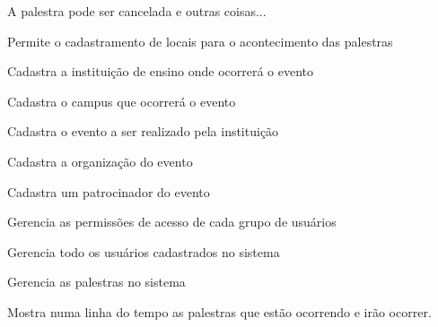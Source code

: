 \documentclass[12pt,a4paper]{article}
\begin{document}
        	{A palestra pode ser cancelada e outras coisas...}
        	{%
        	
        	}
			
        	{Permite o cadastramento de locais para o acontecimento das palestras}
        	{%
        	
        	}
			
        	{Cadastra a instituição de ensino onde ocorrerá o evento}
        	{%
        	
        	}
					
			
        	{Cadastra o campus que ocorrerá o evento}
        	{%
        	
        	}
			
        	{Cadastra o evento a ser realizado pela instituição }
        	{%
        	
        	}
			
        	{Cadastra a organização do evento}
        	{%
        	
        	}
			
        	{Cadastra um patrocinador do evento}
        	{%
        	
        	}
			
        	{}
        	{%
        	
        	}
			
        	{Gerencia as permissões de acesso de cada grupo de usuários}
        	{%
        	
        	}
			
        	{Gerencia todo os usuários cadastrados no sistema}
        	{%
        	
        	}
			
        	{Gerencia as palestras no sistema}
        	{%
        	
        	}
			
        	{Mostra numa linha do tempo as palestras que estão ocorrendo e irão ocorrer.}
        	{%
        	
        	}
			
\end{document}
